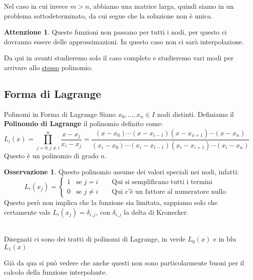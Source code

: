 \documentclass[11pt,a4paper,twoside]{article}
\theoremstyle{definition}
\newtheorem*{oss}{Osservazione}
\newtheorem*{att}{Attenzione}
\begin{document}
Nel caso in cui invece $m>n$, abbiamo una matrice larga, quindi siamo in un problema sottodeterminato, da cui segue che la soluzione non è unica.

\begin{att}
	Queste funzioni non passano per tutti i nodi, per questo ci dovranno essere delle approssimazioni. In questo caso non ci sarà interpolazione.
\end{att}

Da qui in avanti studieremo solo il caso completo e studieremo vari modi per arrivare allo \underline{stesso} polinomio.

\subsection{Forma di Lagrange}

\begin{defn}{Polinomi in Forma di Lagrange}{}
	Siano $x_0,...,x_n \in I$ nodi distinti. Definiamo il \textbf{Polinomio di Lagrange} il polinomio definito come:
	\[  L_i(x) = \prod_{j = 0, j\neq i}^n \frac{x-x_j}{x_i-x_j} = \frac{(x-x_0)\cdots(x-x_{i-1})(x-x_{x+1})\cdots (x-x_n)}{(x_i-x_0)\cdots (x_i-x_{i-1}) (x_i-x_{i+1})\cdots (x_i-x_n)} \]
	Questo è un polinomio di grado $n$.
\end{defn}

\begin{oss}
	Questo polinomio assume dei valori speciali nei nodi, infatti:
	\[ L_i(x_j) = \begin{cases} 1 & \text{se }j = i \qquad \text{Qui si semplificano tutti i termini}\\
	0 & \text{se }j \neq i \qquad \text{Qui c'è un fattore al numeratore nullo}\end{cases} \]
	Questo però non implica che la funzione sia limitata, sappiamo solo che certamente vale $L_i(x_j) = \delta_{i,j}$, con $\delta_{i,j}$ la delta di Kronecker.
	\begin{center}
		\\
		Disegnati ci sono dei tratti di polinomi di Lagrange, in verde $L_0(x)$ e in blu $L_1(x)$
	\end{center}
	Già da qua si può vedere che anche questi non sono particolarmente buoni per il calcolo della funzione interpolante.
\end{oss}
\end{document}
